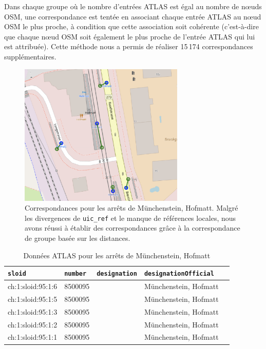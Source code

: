 Dans chaque groupe où le nombre d'entrées ATLAS est égal au nombre de nœuds OSM, une correspondance est tentée en associant chaque entrée ATLAS au nœud OSM le plus proche, à condition que cette association soit cohérente (c'est-à-dire que chaque nœud OSM soit également le plus proche de l'entrée ATLAS qui lui est attribuée). Cette méthode nous a permis de réaliser 15\,174 correspondances supplémentaires.

\begin{figure}[h] 
    \centering
    \includegraphics[width=0.7\textwidth]{../figures/correspondances/groupe_proximite.png}
    \caption[Correspondances – Münchenstein, Hofmatt]{Correspondances pour les arrêts de Münchenstein, Hofmatt. Malgré les divergences de \texttt{uic\_ref} et le manque de références locales, nous avons réussi à établir des correspondances grâce à la correspondance de groupe basée sur les distances.}
    \label{fig:group_proximity_munchenstein}
\end{figure}

\FloatBarrier

\begin{table}
\caption[Données ATLAS – Münchenstein, Hofmatt]{Données ATLAS pour les arrêts de Münchenstein, Hofmatt}
\label{tab:atlas_data}
\centering
\begin{tabular}{l l l l l}
\toprule
\texttt{sloid} & \texttt{number} & \texttt{designation} & \texttt{designationOfficial} \\
\midrule
ch:1:sloid:95:1:6 & 8500095 &  & Münchenstein, Hofmatt \\
ch:1:sloid:95:1:5 & 8500095 &  & Münchenstein, Hofmatt \\
ch:1:sloid:95:1:3 & 8500095 &  & Münchenstein, Hofmatt \\
ch:1:sloid:95:1:2 & 8500095 &  & Münchenstein, Hofmatt \\
ch:1:sloid:95:1:1 & 8500095 &  & Münchenstein, Hofmatt \\
\bottomrule
\end{tabular}
\end{table}

